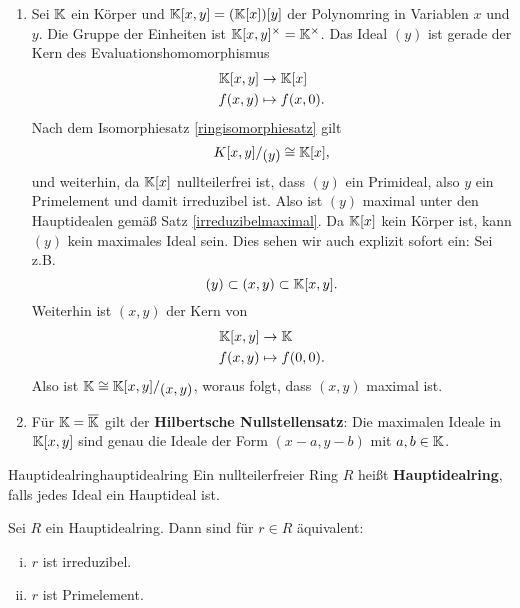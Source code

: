 \begin{beispiele}
\begin{enumerate}
\item Sei $\mathbb{K}$ ein Körper und $\mathbb{K}[x,y] = (\mathbb{K}[x])[y]$ der Polynomring in Variablen $x$ und $y$. Die Gruppe der Einheiten ist $\mathbb{K}[x,y]^\times = \mathbb{K}^\times$. Das Ideal $(y)$ ist gerade der Kern des Evaluationshomomorphismus
\begin{equation}
\begin{split}
\mathbb{K}[x,y] &\to \mathbb{K}[x]\\
f(x,y) &\mapsto f(x,0).
\end{split}
\end{equation}
Nach dem Isomorphiesatz \ref{ringisomorphiesatz} gilt 
\begin{equation}
\quotient{K[x,y]}{(y)} \cong \K[x],
\end{equation}
und weiterhin, da $\mathbb{K}[x]$ nullteilerfrei ist, dass $(y)$ ein Primideal, also $y$ ein Primelement und damit irreduzibel ist. Also ist $(y)$ maximal unter den Hauptidealen gemäß Satz \ref{irreduzibelmaximal}. Da $\mathbb{K}[x]$ kein Körper ist, kann $(y)$ kein maximales Ideal sein. Dies sehen wir auch explizit sofort ein: Sei z.B.
\begin{equation}
(y) \subset (x,y) \subset \mathbb{K}[x,y].
\end{equation}
Weiterhin ist $(x,y)$ der Kern von
\begin{equation}
\begin{split}
\mathbb{K}[x,y] &\to \mathbb{K}\\
f(x,y) &\mapsto f(0,0).
\end{split}
\end{equation}
Also ist $\K \cong \quotient{\K[x,y]}{(x,y)}$, woraus folgt, dass $(x,y)$ maximal ist.
\item Für $\mathbb{K} = \overline{\mathbb{K}}$ gilt der \textbf{Hilbertsche Nullstellensatz}: Die maximalen Ideale in $\mathbb{K}[x,y]$ sind genau die Ideale der Form $(x-a,y-b)$ mit $a,b \in \mathbb{K}$.
\end{enumerate}
\end{beispiele}
\begin{definition}{Hauptidealring}{hauptidealring}
Ein nullteilerfreier Ring $R$ heißt \textbf{Hauptidealring}, falls jedes Ideal ein Hauptideal ist.
\end{definition}
\begin{satz}{}{}
Sei $R$ ein Hauptidealring. Dann sind für $r \in R$ äquivalent:
\begin{enumerate}[(i)]
\item $r$ ist irreduzibel.
\item $r$ ist Primelement.
\end{enumerate}
\end{satz}
